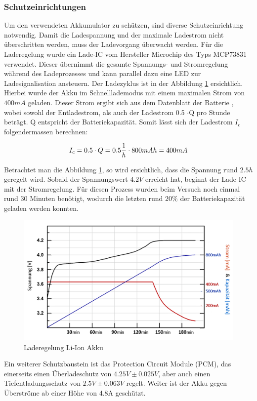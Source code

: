 \subsubsection*{Schutzeinrichtungen}\label{sec:schutzeinrichtung}
Um den verwendeten Akkumulator zu schützen, sind diverse Schutzeinrichtung notwendig. Damit die Ladespannung und der maximale Ladestrom nicht überschritten werden, muss der Ladevorgang überwacht werden. Für die Laderegelung wurde ein Lade-IC vom Hersteller Microchip des Typs MCP73831 verwendet. Dieser übernimmt die gesamte Spannungs- und Stromregelung während des Ladeprozesses und kann parallel dazu eine LED zur Ladesignalisation ansteuern. Der Ladezyklus ist in der Abbildung  \ref{fig:Ladekurve Li-Ion Akku} ersichtlich. Hierbei wurde der Akku im Schnelllademodus mit einem maximalen Strom von $400mA$ geladen. Dieser Strom ergibt sich aus dem Datenblatt der Batterie \cite{LIBattery}, wobei sowohl der Entladestrom, als auch der Ladestrom 0.5 $\cdot$Q pro Stunde beträgt. Q entspricht der Batteriekapazität. Somit lässt sich der Ladestrom $I_c$ folgendermassen berechnen:

\begin{equation}
\centering
I_{c}= 0.5 \cdot Q = 0.5 \dfrac{1}{h} \cdot 800mAh= 400mA
\label{eq:Ladestrom}
\end{equation}

Betrachtet man die Abbildung \ref{fig:Ladekurve Li-Ion Akku}, so wird ersichtlich, dass die Spannung rund $2.5h$ geregelt wird. Sobald der Spannungswert $4.2V$ erreicht hat, beginnt der Lade-IC mit der Stromregelung. Für diesen Prozess wurden beim Versuch noch einmal rund 30 Minuten benötigt, wodurch die letzten rund $20\%$ der Batteriekapazität geladen werden konnten.

\begin{figure}[H]
	\begin{center}
		\includegraphics[width=120mm]{data/LadekurveLiIon.png}
		\caption[Laderegelung Li-Ion Akku]{Laderegelung Li-Ion Akku} %
		\label{fig:Ladekurve Li-Ion Akku}
	\end{center}
\end{figure}


Ein weiterer Schutzbaustein ist das Protection Circuit Module (PCM), das einerseits einen Überladeschutz von $4.25V\pm 0.025V$, aber auch einen Tiefentladungsschutz von $2.5V\pm 0.063V$ regelt. Weiter ist der Akku gegen Überströme ab einer Höhe von 4.8A geschützt.